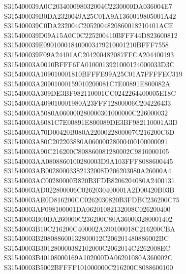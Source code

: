 \documentclass[12pt,a4paper]{article}
\begin{document}
\begin{framed}
{S315400039A0C203400098032004C2230000DA036004E7\newline
S315400039B0DA2320049A25C01A9A1360019805001A42\newline
S315400039C0DA232004C2052004820860018210401ACE\newline
S315400039D09A15A0C0C225200410BFFF44D823600812\newline
S315400039E090100018400003479210001210BFFF7558\newline
S315400039F09A24401AC204200482087FFCA204400193\newline
S31540003A0010BFFF6FA0100013921000124000033D3C\newline
S31540003A109010001810BFFFE99A25C01A7FFFFEC319\newline
S31540003A20901000159010200081C7E00891E800082A\newline
S31540003A309DE3BF982110001CC0242264400005E18C\newline
S31540003A409010001980A23FFF12800006C204226433\newline
S31540003A5080A060000280000301000000C226000032\newline
S31540003A6081C7E00891E800089DE3BF982110001A3D\newline
S31540003A70D00420B080A2200022800007C216200C6D\newline
S31540003A80C202203880A06000028000400100000091\newline
S31540003A90C216200C808860081280002C9810000105\newline
S31540003AA0808860100280003D9A103FFF8088600445\newline
S31540003AB00280003382132008D206203080A26000A4\newline
S31540003AC00280000B820B3FDB8206204080A2400131\newline
S31540003AD022800006C0262030400001A2D00420B03B\newline
S31540003AE0D816200CC0262030820B3FDBC236200C75\newline
S31540003AF098100001DA06201082132008C026200400\newline
S31540003B00DA260000C236200C80A360003280001402\newline
S31540003B10C216200C400002A390100018C216200CBA\newline
S31540003B208088600132800012C206201480886002BC\newline
S31540003B301280000382102000C2062014C2262008EC\newline
S31540003B40108000169A102000DA06201080A360002C\newline
S31540003B5002BFFFF101000000C216200C8088600100\newline
}
\end{framed}
\end{document}
